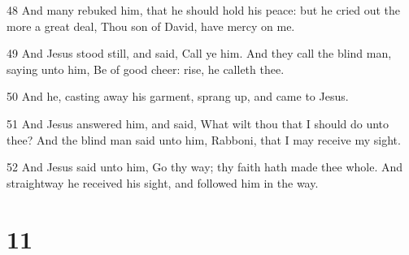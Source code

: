 \par 48 And many rebuked him, that he should hold his peace: but he cried out the more a great deal, Thou son of David, have mercy on me.
\par 49 And Jesus stood still, and said, Call ye him. And they call the blind man, saying unto him, Be of good cheer: rise, he calleth thee.
\par 50 And he, casting away his garment, sprang up, and came to Jesus.
\par 51 And Jesus answered him, and said, What wilt thou that I should do unto thee? And the blind man said unto him, Rabboni, that I may receive my sight.
\par 52 And Jesus said unto him, Go thy way; thy faith hath made thee whole. And straightway he received his sight, and followed him in the way.

\chapter{11}

